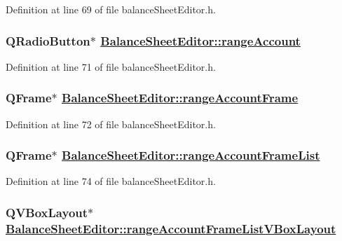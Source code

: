 Definition at line 69 of file balance\-Sheet\-Editor.h.\hypertarget{classBalanceSheetEditor_r14}{
\subsubsection[rangeAccount]{\setlength{\rightskip}{0pt plus 5cm}QRadio\-Button$\ast$ \hyperlink{classBalanceSheetEditor_r14}{Balance\-Sheet\-Editor::range\-Account}}}
\label{classBalanceSheetEditor_r14}


Definition at line 71 of file balance\-Sheet\-Editor.h.\hypertarget{classBalanceSheetEditor_r15}{
\subsubsection[rangeAccountFrame]{\setlength{\rightskip}{0pt plus 5cm}QFrame$\ast$ \hyperlink{classBalanceSheetEditor_r15}{Balance\-Sheet\-Editor::range\-Account\-Frame}}}
\label{classBalanceSheetEditor_r15}


Definition at line 72 of file balance\-Sheet\-Editor.h.\hypertarget{classBalanceSheetEditor_r17}{
\subsubsection[rangeAccountFrameList]{\setlength{\rightskip}{0pt plus 5cm}QFrame$\ast$ \hyperlink{classBalanceSheetEditor_r17}{Balance\-Sheet\-Editor::range\-Account\-Frame\-List}}}
\label{classBalanceSheetEditor_r17}


Definition at line 74 of file balance\-Sheet\-Editor.h.\hypertarget{classBalanceSheetEditor_r18}{
\subsubsection[rangeAccountFrameListVBoxLayout]{\setlength{\rightskip}{0pt plus 5cm}QVBox\-Layout$\ast$ \hyperlink{classBalanceSheetEditor_r18}{Balance\-Sheet\-Editor::range\-Account\-Frame\-List\-VBox\-Layout}}}
\label{classBalanceSheetEditor_r18}


